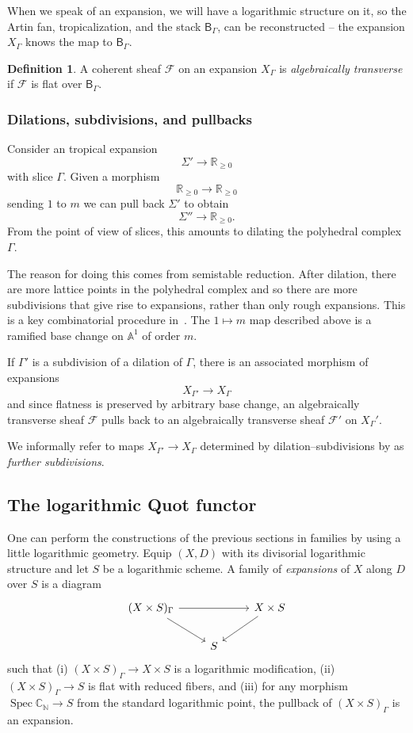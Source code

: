 \documentclass[11pt]{amsart}
\theoremstyle{definition}
\theoremstyle{definition}
\newtheorem{definition}[theorem]{Definition}
\newcommand{\RR}{\mathbb{R}}
\newcommand{\Spec}{\operatorname{Spec}}
\begin{document}
When we speak of an expansion, we will have a logarithmic structure on it, so the Artin fan, tropicalization, and the stack $\mathsf B_\Gamma$, can be reconstructed -- the expansion $X_\Gamma$ knows the map to $\mathsf B_\Gamma$. 

\begin{definition}
A coherent sheaf $\mathcal F$ on an expansion $X_\Gamma$ is {\it algebraically transverse} if $\mathcal F$ is flat over $\mathsf B_\Gamma$. 
\end{definition}

\subsubsection{Dilations, subdivisions, and pullbacks} Consider an tropical expansion
\[
\Sigma'\to \RR_{\geq 0}
\]
with slice $\Gamma$. Given a morphism
\[
\mathbb R_{\geq 0}\to \mathbb R_{\geq 0}
\]
sending $1$ to $m$ we can pull back $\Sigma'$ to obtain 
\[
\Sigma''\to \RR_{\geq 0}. 
\]
From the point of view of slices, this amounts to dilating the polyhedral complex $\Gamma$. 

The reason for doing this comes from semistable reduction. After dilation, there are more lattice points in the polyhedral complex and so there are more subdivisions that give rise to expansions, rather than only rough expansions. This is a key combinatorial procedure in~\cite{KKMSD}. The $1\mapsto m$ map described above is a ramified base change on $\mathbb A^1$ of order $m$. 

If $\Gamma'$ is a subdivision of a dilation of $\Gamma$, there is an associated morphism of expansions
\[
X_{\Gamma'}\to X_\Gamma
\]
and since flatness is preserved by arbitrary base change, an algebraically transverse sheaf $\mathcal F$ pulls back to an algebraically transverse sheaf $\mathcal F'$ on $X_\Gamma'$. 

We informally refer to maps $X_{\Gamma'}\to X_\Gamma$ determined by dilation--subdivisions by as {\it further subdivisions}. 

\subsection{The logarithmic Quot functor} One can perform the constructions of the previous sections in families by using a little logarithmic geometry. Equip $(X,D)$ with its divisorial logarithmic structure and let $S$ be a logarithmic scheme. A family of {\it expansions} of $X$ along $D$ over $S$ is a diagram
\[
\begin{tikzcd}
(X\times S)_\Gamma\arrow{dr} \arrow{rr}& & X\times S\arrow{dl}\\
&S&
\end{tikzcd}
\]
such that (i) $(X\times S)_\Gamma\to X\times S$ is a logarithmic modification, (ii) $(X\times S)_\Gamma\to S$ is flat with reduced fibers, and (iii) for any morphism $\Spec \mathbb C_{\mathbb N}\to S$ from the standard logarithmic point, the pullback of $(X\times S)_\Gamma$ is an expansion. 
\end{document}

